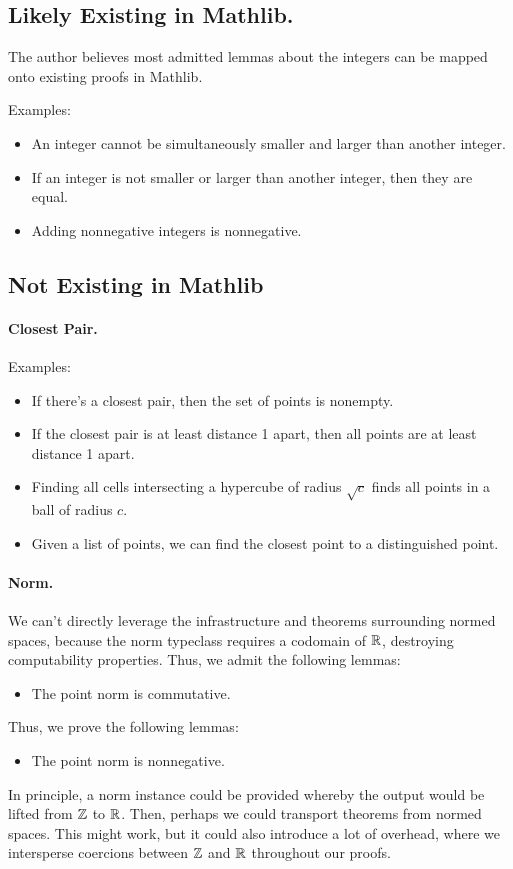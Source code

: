 \documentclass{article}
\begin{document}
\subsection{Likely Existing in Mathlib.}
The author believes most admitted lemmas about the integers can be mapped onto existing proofs in Mathlib.

Examples:
\begin{itemize}
  \item An integer cannot be simultaneously smaller and larger than another integer.
  \item If an integer is not smaller or larger than another integer, then they are equal.
  \item Adding nonnegative integers is nonnegative.
\end{itemize}

\subsection{Not Existing in Mathlib}
\paragraph{Closest Pair.}
Examples:
\begin{itemize}
  \item If there's a closest pair, then the set of points is nonempty.
  \item If the closest pair is at least distance 1 apart, then all points are at least distance 1 apart.
  \item Finding all cells intersecting a hypercube of radius $\sqrt{c}$ finds all points in a ball of radius $c$.
  \item Given a list of points, we can find the closest point to a distinguished point.
\end{itemize}

\paragraph{Norm.}
We can't directly leverage the infrastructure and theorems surrounding normed spaces, because the norm typeclass requires a codomain of $\mathbb{R}$, destroying computability properties.
Thus, we admit the following lemmas:
\begin{itemize}
  \item The point norm is commutative.
\end{itemize}
Thus, we prove the following lemmas:
\begin{itemize}
  \item The point norm is nonnegative.
\end{itemize}
In principle, a norm instance could be provided whereby the output would be lifted from $\mathbb{Z}$ to $\mathbb{R}$.
Then, perhaps we could transport theorems from normed spaces.
This might work, but it could also introduce a lot of overhead, where we intersperse coercions between $\mathbb{Z}$ and $\mathbb{R}$ throughout our proofs.
\end{document}
